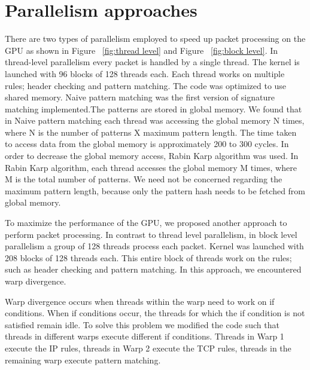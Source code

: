 \section{Parallelism approaches}

There are two types of parallelism employed to speed up packet processing on the GPU as shown in Figure ~\ref{fig:thread level} and Figure ~\ref{fig:block level}. In thread-level parallelism every packet is handled by a single thread. The kernel is launched with 96 blocks of 128 threads each. Each thread works on multiple rules; header checking and pattern matching. The code was optimized to use shared memory. Naive pattern matching was the first version of signature matching implemented.The patterns are stored in global memory. We found that in Naive pattern matching each thread was accessing the global memory N times, where N is the number of patterns X maximum pattern length. The time taken to access data from the global memory is approximately 200 to 300 cycles. In order to decrease the global memory access, Rabin Karp algorithm was used. In Rabin Karp algorithm, each thread accesses the global memory M times, where M is the total number of patterns. We need not be concerned regarding the maximum pattern length, because only the pattern hash needs to be fetched from global memory.

To maximize the performance of the GPU, we proposed another approach to perform packet processing. In contrast to thread level parallelism, in block level parallelism a group of 128 threads process each packet. Kernel was launched with 208 blocks of 128 threads each. This entire block of threads work on the rules; such as header checking and pattern matching. In this approach, we encountered warp divergence. 

Warp divergence occurs when threads within the warp need to work on if conditions. When if conditions occur, the threads for which the if condition is not satisfied remain idle. To solve this problem we modified the code such that threads in different warps execute different if conditions. Threads in Warp 1 execute the IP rules, threads in Warp 2 execute the TCP rules, threads in the remaining warp execute pattern matching.

